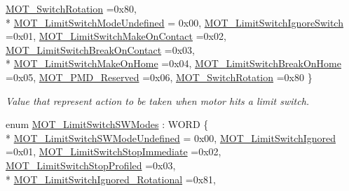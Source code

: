 \begin{DoxyCompactItemize}
\hyperlink{group___common_gga682c3ff98dc472fbdc3cbc3267d38796a1940ea78ff85f568ed44abc65aa17e09}{M\+O\+T\+\_\+\+Switch\+Rotation} =0x80, 
\\*
\hyperlink{group___common_gga682c3ff98dc472fbdc3cbc3267d38796a5d1c87f59088fb4c61890ee9f7e396d8}{M\+O\+T\+\_\+\+Limit\+Switch\+Mode\+Undefined} = 0x00, 
\hyperlink{group___common_gga682c3ff98dc472fbdc3cbc3267d38796a4597f8cb8699917b05a17043355b6b4e}{M\+O\+T\+\_\+\+Limit\+Switch\+Ignore\+Switch} =0x01, 
\hyperlink{group___common_gga682c3ff98dc472fbdc3cbc3267d38796a71019889786145d78d206ebfe8532582}{M\+O\+T\+\_\+\+Limit\+Switch\+Make\+On\+Contact} =0x02, 
\hyperlink{group___common_gga682c3ff98dc472fbdc3cbc3267d38796a8ede426a957ea9aaccb56eb9fbdd65f3}{M\+O\+T\+\_\+\+Limit\+Switch\+Break\+On\+Contact} =0x03, 
\\*
\hyperlink{group___common_gga682c3ff98dc472fbdc3cbc3267d38796a6befefb68076e7c2ebd3a3174857d814}{M\+O\+T\+\_\+\+Limit\+Switch\+Make\+On\+Home} =0x04, 
\hyperlink{group___common_gga682c3ff98dc472fbdc3cbc3267d38796a0f7d30a1b18750e5d8d959c05ff16815}{M\+O\+T\+\_\+\+Limit\+Switch\+Break\+On\+Home} =0x05, 
\hyperlink{group___common_gga682c3ff98dc472fbdc3cbc3267d38796a4da0cb79d5cc0720c05912f0341b9365}{M\+O\+T\+\_\+\+P\+M\+D\+\_\+\+Reserved} =0x06, 
\hyperlink{group___common_gga682c3ff98dc472fbdc3cbc3267d38796a1940ea78ff85f568ed44abc65aa17e09}{M\+O\+T\+\_\+\+Switch\+Rotation} =0x80
 \}\begin{DoxyCompactList}\small\item\em Value that represent action to be taken when motor hits a limit switch. \end{DoxyCompactList}
\item 
enum \hyperlink{group___common_ga7d4db5fc799ed3fd24818bff565afd85}{M\+O\+T\+\_\+\+Limit\+Switch\+S\+W\+Modes} \+: W\+O\+RD \{ \\*
\hyperlink{group___common_gga7d4db5fc799ed3fd24818bff565afd85a4ad3d4ea235e662dc262a8590f1de2da}{M\+O\+T\+\_\+\+Limit\+Switch\+S\+W\+Mode\+Undefined} = 0x00, 
\hyperlink{group___common_gga7d4db5fc799ed3fd24818bff565afd85aa6281a52eae594413bbdd608ca38e00e}{M\+O\+T\+\_\+\+Limit\+Switch\+Ignored} =0x01, 
\hyperlink{group___common_gga7d4db5fc799ed3fd24818bff565afd85a5ad558f043ef9f21cb0d7adbbbd759a4}{M\+O\+T\+\_\+\+Limit\+Switch\+Stop\+Immediate} =0x02, 
\hyperlink{group___common_gga7d4db5fc799ed3fd24818bff565afd85ada5c4869e7fefa8f76f593d214c0c830}{M\+O\+T\+\_\+\+Limit\+Switch\+Stop\+Profiled} =0x03, 
\\*
\hyperlink{group___common_gga7d4db5fc799ed3fd24818bff565afd85a5aabe1197e36ba92db98dca8a959f243}{M\+O\+T\+\_\+\+Limit\+Switch\+Ignored\+\_\+\+Rotational} =0x81, 

\end{DoxyCompactItemize}
